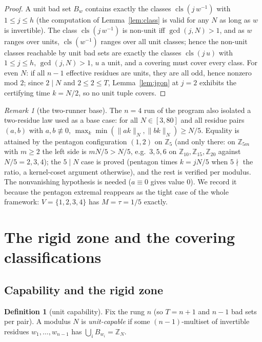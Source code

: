 \documentclass[11pt,a4paper]{article}
\numberwithin{equation}{section}
\theoremstyle{plain}
\theoremstyle{definition}
\newtheorem{definition}[theorem]{Definition}
\theoremstyle{remark}
\newtheorem{remark}[theorem]{Remark}
\newcommand{\Z}{\mathbb{Z}}
\newcommand{\wn}[1]{\lVert #1 \rVert_{N}}
\DeclareMathOperator{\cls}{cls}
\begin{document}
\begin{proof}
A unit bad set $B_w$ contains exactly the classes $\cls(j\,w^{-1})$ with
$1\le j\le h$ (the computation of Lemma~\ref{lem:class} is valid for any
$N$ as long as $w$ is invertible). The class $\cls(j\,w^{-1})$ is
non-unit iff $\gcd(j,N)>1$, and as $w$ ranges over units, $\cls(w^{-1})$
ranges over all unit classes; hence the non-unit classes reachable by unit
bad sets are exactly the classes $\cls(j\,u)$ with $1\le j\le h$,
$\gcd(j,N)>1$, $u$ a unit, and a covering must cover every class. For
even $N$: if all $n-1$ effective residues are units, they are all odd,
hence nonzero mod $2$; since $2\mid N$ and $2\le 2\le T$,
Lemma~\ref{lem:jgon} at $j=2$ exhibits the certifying time $k=N/2$, so
no unit tuple covers.
\end{proof}

\begin{remark}[the two-runner base]\label{rem:tworunner}
The $n=4$ run of the program also isolated a two-residue law used as a
base case: for all $N\in[3,80]$ and all residue pairs $(a,b)$ with
$a,b\not\equiv 0$,
$\max_k\min(\wn{ak},\wn{bk})\ge N/5$. Equality is attained by the
pentagon configuration $(1,2)$ on $\Z_5$ (and only there: on $\Z_{5m}$
with $m\ge 2$ the left side is $mN/5>N/5$, e.g.\ $3,5,6$ on
$\Z_{10},\Z_{15},\Z_{20}$ against $N/5=2,3,4$); the $5\mid N$ case is
proved (pentagon times $k=jN/5$ when $5\nmid$ the ratio, a kernel-coset
argument otherwise), and the rest is verified per modulus. The
nonvanishing hypothesis is needed ($a\equiv 0$ gives value $0$). We
record it because the pentagon extremal reappears as the tight case of
the whole framework: $V=\{1,2,3,4\}$ has $M=\tau=1/5$ exactly.
\end{remark}


\section{The rigid zone and the covering classifications}\label{sec:rigid}

\subsection{Capability and the rigid zone}

\begin{definition}[unit capability]\label{def:capable}
Fix the rung $n$ (so $T=n+1$ and $n-1$ bad sets per pair). A modulus $N$
is \emph{unit-capable} if some $(n{-}1)$-multiset of invertible residues
$w_1,\dots,w_{n-1}$ has $\bigcup_i B_{w_i}=\Z_N$.
\end{definition}
\end{document}
